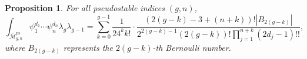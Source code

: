 \documentclass[leqno,12pt]{amsart}
\newtheorem{proposition}[theorem]{Proposition}
\theoremstyle{remark}
\newtheorem{remark}[theorem]{Remark}
\newtheorem{example}[theorem]{Example}
\numberwithin{equation}{section}
\DeclareMathOperator{\ps}{ps}
\begin{document}




\begin{proposition}
    For all pseudostable indices $(g, n)$, 
    $$
    \int_{\overline{\mathcal{M}}^{\ps}_{g, n}} \psi_1^{d_1}\cdots \psi_n^{d_n}\lambda_g\lambda_{g-1} = \sum_{k=0}^{g-1}\frac{1}{24^kk!}\cdot\frac{(2(g-k)-3+(n+k))!|B_{2(g-k)}|}{2^{2(g-k)-1}(2(g-k))!\prod_{j=1}^{n+k}(2d_j-1)!!},
    $$
    where $B_{2(g-k)}$ represents the $2(g-k)$-th Bernoulli number.
\end{proposition}
\end{document}
